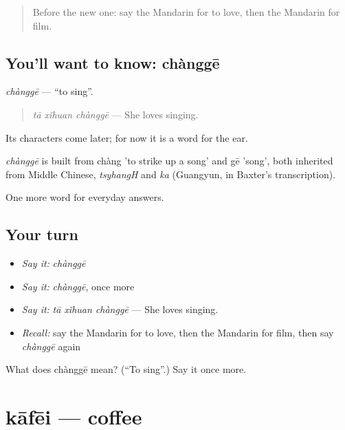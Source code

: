 \begin{quote}
Before the new one: say the Mandarin for to love, then the Mandarin for film.
\end{quote}

\subsection*{You'll want to know: chànggē}
\emph{chànggē} — \textquotedblleft{}to sing\textquotedblright{}.

\begin{quote}
\emph{tā xǐhuan chànggē} — She loves singing.
\end{quote}

Its characters come later; for now it is a word for the ear.

\begin{cousinweb}
\emph{chànggē} is built from chàng 'to strike up a song' and gē 'song', both inherited from Middle Chinese, \emph{tsyhangH} and \emph{ka} (Guangyun, in Baxter's transcription).
\end{cousinweb}

\begin{grammarlens}[title={What you've built}]
One more word for everyday answers.
\end{grammarlens}

\subsection*{Your turn}
\begin{itemize}
\raggedright
  \item \emph{Say it:} \emph{chànggē}
  \item \emph{Say it:} \emph{chànggē}, once more
  \item \emph{Say it:} \emph{tā xǐhuan chànggē} — She loves singing.
  \item \emph{Recall:} say the Mandarin for to love, then the Mandarin for film, then say \emph{chànggē} again
\end{itemize}

\begin{tcolorbox}[breakable,colback=teal!4,colframe=teal!35!black,title={Before you move on}]
What does chànggē mean? (\textquotedblleft{}To sing\textquotedblright{}.) Say it once more.
\end{tcolorbox}
\section[kāfēi]{kāfēi — coffee}


